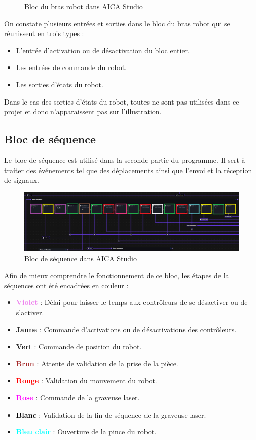 \begin{figure}[H]
    \caption{Bloc du bras robot dans AICA Studio}
    \label{fig:robot_block}
\end{figure}

On constate plusieurs entrées et sorties dans le bloc du bras robot qui se réunissent en trois types :
\begin{itemize}
    \item L'entrée d'activation ou de désactivation du bloc entier.
    \item Les entrées de commande du robot.
    \item Les sorties d'états du robot.
\end{itemize}
Dans le cas des sorties d'états du robot, toutes ne sont pas utilisées dans ce projet et donc n'apparaissent pas sur l'illustration.



\subsection{Bloc de séquence}

Le bloc de séquence est utilisé dans la seconde partie du programme. Il sert à traiter des événements tel que des déplacements ainsi que l'envoi et la réception de signaux.

\begin{figure}[H]
    \centering
    \includegraphics[width=1\textwidth]{assets/figures/AICA_Sequence (2).png}
    \caption{Bloc de séquence dans AICA Studio}
    \label{fig:sequence_block}
\end{figure}

Afin de mieux comprendre le fonctionnement de ce bloc, les étapes de la séquences ont été encadrées en couleur :
\begin{itemize}
    \item \textbf{\textcolor{violet}{Violet}} : Délai pour laisser le temps aux contrôleurs de se désactiver ou de s'activer.
    \item \textbf{\textcolor{yellow!80!black}{Jaune}} : Commande d'activations ou de désactivations des contrôleurs.
    \item \textbf{\textcolor{green!70!black}{Vert}} : Commande de position du robot.
    \item \textbf{\textcolor{brown}{Brun}} : Attente de validation de la prise de la pièce.
    \item \textbf{\textcolor{red}{Rouge}} : Validation du mouvement du robot.
    \item \textbf{\textcolor{magenta}{Rose}} : Commande de la graveuse laser.
    \item \textbf{\textcolor{black}{Blanc}} : Validation de la fin de séquence de la graveuse laser.
    \item \textbf{\textcolor{cyan}{Bleu clair}} : Ouverture de la pince du robot.
\end{itemize}


